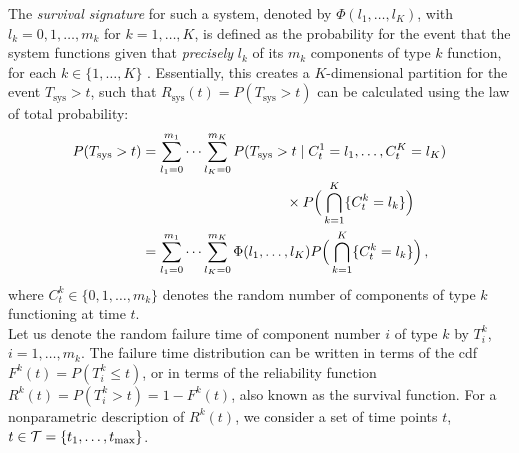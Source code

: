 \documentclass[12pt, a4paper]{elsarticle}
\newcommand{\Rsys}{R_\text{sys}}
\def\Tsys{T_\text{sys}}
\def\tmax{t_\text{max}}
\begin{document}
The \emph{survival signature} for such a system, denoted by $\Phi(l_1,\ldots,l_K)$, with $l_k=0,1,\ldots,m_k$ 
for $k=1,\ldots,K$, is defined as the probability for the event that the system functions given that \emph{precisely} $l_k$ of its 
$m_k$ components of type $k$ function, for each $k\in \{1,\ldots,K\}$ \citep{2012:survsign}.
Essentially, this creates a $K$-dimensional partition for the event $\Tsys > t$, such that $\Rsys(t) = P(\Tsys > t)$
can be calculated using the law of total probability:
\begin{align}
\label{eq:rsyswithsurvsign}
P(\Tsys > t)
 &= \sum_{l_1=0}^{m_1} \cdots \sum_{l_K=0}^{m_K} P(\Tsys > t \mid C^1_t = l_1,\ldots, C^K_t = l_K) \nonumber\\
 &  \hspace*{24ex}                        \times P\Big( \bigcap_{k=1}^K \{ C^k_t = l_k\} \Big) \nonumber\\
 &= \sum_{l_1=0}^{m_1} \cdots \sum_{l_K=0}^{m_K} \Phi(l_1, \ldots, l_K)
                                                 P\Big( \bigcap_{k=1}^K \{ C^k_t = l_k\} \Big) \,,
\end{align}
where $C^k_t \in \{0, 1, \ldots, m_k\}$ denotes
the random number of components of type $k$ functioning at time $t$.\\



Let us denote the random failure time of component number $i$ of type $k$ by $T^k_i$, $i = 1, \ldots, m_k$.
The failure time distribution can be written in terms of the cdf $F^k(t) = P(T^k_i \le t)$,
or in terms of the reliability function $R^k(t) = P(T^k_i > t) = 1 - F^k(t)$,
also known as the survival function.
For a nonparametric description of $R^k(t)$,
we consider a set of time points $t$, $t \in {\cal T} = \{t_1, \ldots, \tmax\}$.
\end{document}
